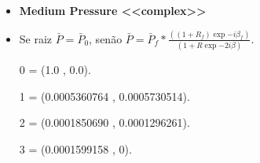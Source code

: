 \documentclass[10pt]{beamer}
\theoremstyle{remark}
\theoremstyle{definition}
\begin{document}
\begin{frame}[allowframebreaks]
\begin{itemize}
	\end{itemize}
		
		\framebreak

	\begin{itemize}
		\item \textbf{Medium Pressure <<complex>>}
		\item Se raiz $ \bar{P} = \bar{P}_0 $, senão $ \bar{P} = \bar{P}_f * \frac{((1 + R_f)\exp{-i\beta_f})}{(1 + R\exp{-2i\beta})}$.
		\item [0] = (1.0  ,  0.0).
		\item [1] = (0.0005360764  ,  0.0005730514).
		\item [2] = (0.0001850690  ,  0.0001296261).
		\item [3] = (0.0001599158  ,  0).
	
	\end{itemize}
		
\end{frame}
	
	
	
\end{document}
